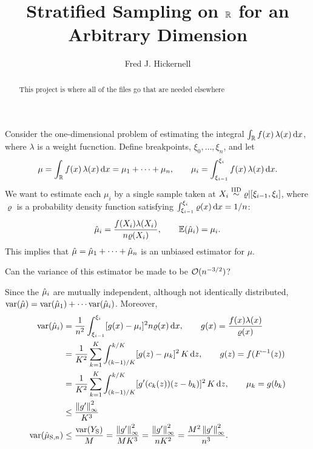 \documentclass{amsart}
\begin{document}
\title{Stratified Sampling on $\reals$ for an Arbitrary Dimension}
\author{Fred J. Hickernell}
\begin{abstract}This project is where all of the files go that are needed elsewhere
\end{abstract}

\maketitle

Consider the one-dimensional problem of estimating the integral $\int_{\reals} f(x) \, \lambda(x) \, \dif x$, where $\lambda$ is a weight fucnction.  Define breakpoints, $\xi_0, \ldots, \xi_n$, and let 
\begin{equation*}
    \mu = \int_{\reals} f(x) \, \lambda(x) \, \dif x = \mu_1 + \cdots + \mu_n, \qquad \mu_i = \int_{\xi_{i-1}}^{\xi_i} f(x) \, \lambda(x) \, \dif x.
\end{equation*}
We want to estimate each $\mu_i$ by a single sample taken at $X_i \IIDsim \varrho|[\xi_{i-1},\xi_i]$, where $\varrho$ is a probability density function satisfying $\int_{\xi_{i-1}}^{\xi_i} \varrho(x) \, \dif x =  1/n$:
\begin{equation*}
    \hmu_i = \frac{f(X_i) \lambda(X_i)}{n\varrho(X_i)}, \qquad \bbE(\hmu_i) = \mu_i.
\end{equation*}
This implies that $\hmu = \hmu_1 + \cdots + \hmu_n$ is an unbiased estimator for $\mu$.

Can the variance of this estimator be made to be $\Order(n^{-3/2})$?

Since the $\hmu_i$ are mutually independent, although not identically distributed, $\var(\hmu) = \var(\hmu_1) + \cdots \var(\hmu_i)$.  Moreover,
\begin{align*}
\var(\hmu_i) & = \frac{1}{n^2} \int_{\xi_{i-1}}^{\xi_i} [g(x) - \mu_i]^2 n\varrho(x) \, \dif x, \qquad g(x) =  \frac{f(x) \lambda(x)}{\varrho(x)} \\
& = \frac{1}{K^2}\sum_{k=1}^K \int_{(k-1)/K}^{k/K} [g(z) - \mu_k]^2 \, K \, \dif z, \qquad g(z) = f(F^{-1}(z)) \\
& = \frac{1}{K^2}\sum_{k=1}^K \int_{(k-1)/K}^{k/K} [g'(c_{k}(z))(z-b_k)]^2 \, K \,\dif z, \qquad \mu_k=g(b_k) \\
& \le \frac{\norm[\infty]{g'}^2}{K^3} \\
\var(\hmu_{\text{S},n})& \le \frac{\var(Y_{\text{S}})}{M} = \frac{\norm[\infty]{g'}^2}{MK^3} =\frac{\norm[\infty]{g'}^2}{nK^2} = \frac{M^2\norm[\infty]{g'}^2}{n^3} .
\end{align*}
\end{document}
